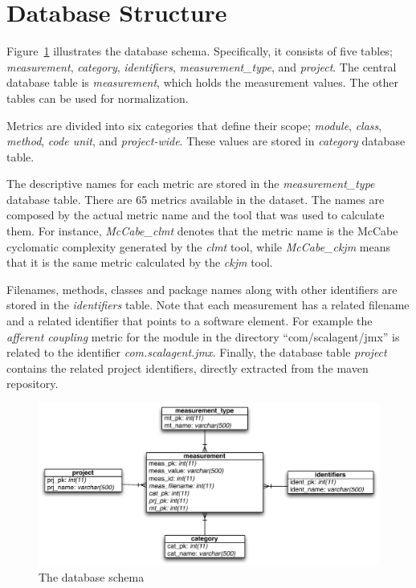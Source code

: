 \documentclass{sig-alternate}
\begin{document}
\section{Database Structure}
\label{sec:db}

Figure~\ref{fig:database-schema} illustrates the database schema. Specifically, it consists of five tables; \textit{measurement}, \textit{category}, \textit{identifiers}, \textit{measurement\_type}, and \textit{project}. The central database table is \textit{measurement}, which holds the measurement values. The other tables can be used for normalization.

Metrics are divided into six categories that define their scope; \textit{module}, \textit{class}, \textit{method}, \textit{code unit}, and \textit{project-wide}. These values are stored in \textit{category} database table.

The descriptive names for each metric are stored in the \textit{measurement\_type} database table. There are 65 metrics available in the dataset. The names are composed by the actual metric name and the tool that was used to calculate them. For instance, \textit{McCabe\_clmt} denotes that the metric name is the McCabe cyclomatic complexity generated by the \textit{clmt} tool, while \textit{McCabe\_ckjm} means that it is the same metric calculated by the \textit{ckjm} tool.

Filenames, methods, classes and package names along with other identifiers are stored in the \textit{identifiers} table. Note that each measurement has a related filename and a related identifier that points to a software element. For example the \textit{afferent coupling} metric for the module in the directory ``com/scalagent/jmx'' is related to the identifier \textit{com.scalagent.jmx}.
Finally, the database table \textit{project} contains the related project identifiers, directly extracted from the maven repository.

\begin{figure}
\centering
\includegraphics[scale=0.7]{database-schema}
\caption{The database schema}
\label{fig:database-schema}
\end{figure}
\end{document}
